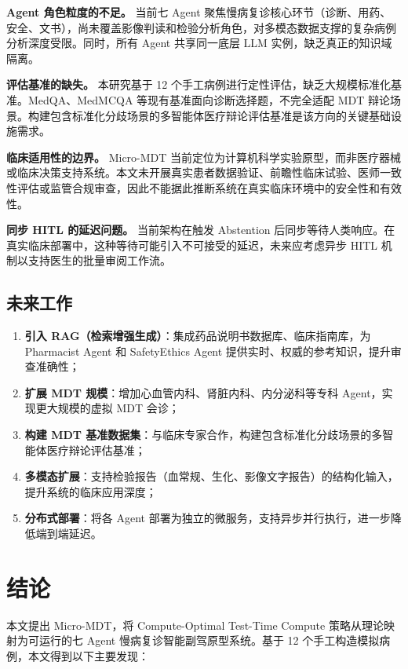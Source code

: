 \documentclass[11pt,a4paper]{ctexart}
\begin{document}
\textbf{Agent 角色粒度的不足。} 当前七 Agent 聚焦慢病复诊核心环节（诊断、用药、安全、文书），尚未覆盖影像判读和检验分析角色，对多模态数据支撑的复杂病例分析深度受限。同时，所有 Agent 共享同一底层 LLM 实例，缺乏真正的知识域隔离。

\textbf{评估基准的缺失。} 本研究基于 12 个手工病例进行定性评估，缺乏大规模标准化基准。MedQA、MedMCQA 等现有基准面向诊断选择题，不完全适配 MDT 辩论场景。构建包含标准化分歧场景的多智能体医疗辩论评估基准是该方向的关键基础设施需求。

\textbf{临床适用性的边界。} Micro-MDT 当前定位为计算机科学实验原型，而非医疗器械或临床决策支持系统。本文未开展真实患者数据验证、前瞻性临床试验、医师一致性评估或监管合规审查，因此不能据此推断系统在真实临床环境中的安全性和有效性。

\textbf{同步 HITL 的延迟问题。} 当前架构在触发 Abstention 后同步等待人类响应。在真实临床部署中，这种等待可能引入不可接受的延迟，未来应考虑异步 HITL 机制以支持医生的批量审阅工作流。

\subsection{未来工作}

\begin{enumerate}[label=(\arabic*),leftmargin=2em]
    \item \textbf{引入 RAG（检索增强生成）}：集成药品说明书数据库、临床指南库，为 Pharmacist Agent 和 SafetyEthics Agent 提供实时、权威的参考知识，提升审查准确性；
    \item \textbf{扩展 MDT 规模}：增加心血管内科、肾脏内科、内分泌科等专科 Agent，实现更大规模的虚拟 MDT 会诊；
    \item \textbf{构建 MDT 基准数据集}：与临床专家合作，构建包含标准化分歧场景的多智能体医疗辩论评估基准；
    \item \textbf{多模态扩展}：支持检验报告（血常规、生化、影像文字报告）的结构化输入，提升系统的临床应用深度；
    \item \textbf{分布式部署}：将各 Agent 部署为独立的微服务，支持异步并行执行，进一步降低端到端延迟。
\end{enumerate}

\section{结论}

本文提出 Micro-MDT，将 Compute-Optimal Test-Time Compute 策略从理论映射为可运行的七 Agent 慢病复诊智能副驾原型系统。基于 12 个手工构造模拟病例，本文得到以下主要发现：
\end{document}
